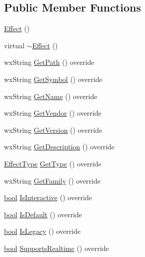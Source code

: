 \subsection*{Public Member Functions}
\begin{DoxyCompactItemize}
\item 
\hyperlink{class_effect_a4dae74244f59936a49847da9217b4126}{Effect} ()
\item 
virtual \hyperlink{class_effect_ac26c0a394247e14c9081f875522b5b66}{$\sim$\+Effect} ()
\item 
wx\+String \hyperlink{class_effect_a943281414ea9d5a4a94d7c0f77914c81}{Get\+Path} () override
\item 
wx\+String \hyperlink{class_effect_a9d3efabee9b08c83cf21888181aa3ac4}{Get\+Symbol} () override
\item 
wx\+String \hyperlink{class_effect_abf4cb8b7c9b5179651dc5a5159fd168e}{Get\+Name} () override
\item 
wx\+String \hyperlink{class_effect_ab1985c15794aa282b7bec7f794c68b5a}{Get\+Vendor} () override
\item 
wx\+String \hyperlink{class_effect_aa7da4a49885d4ee039a5e4a00dfde6ca}{Get\+Version} () override
\item 
wx\+String \hyperlink{class_effect_abd891587dbb0c76b4e6755aff5f8af9e}{Get\+Description} () override
\item 
\hyperlink{_effect_interface_8h_a4809a7bb3fd1a421902a667cc1405d43}{Effect\+Type} \hyperlink{class_effect_ae21a3ad02f4527cd1ba46bcc93972f32}{Get\+Type} () override
\item 
wx\+String \hyperlink{class_effect_ac80e1e3686fcaec4c73adca19c754dd0}{Get\+Family} () override
\item 
\hyperlink{mac_2config_2i386_2lib-src_2libsoxr_2soxr-config_8h_abb452686968e48b67397da5f97445f5b}{bool} \hyperlink{class_effect_ab2eadc18442f6e44d211c14f5abfc7b2}{Is\+Interactive} () override
\item 
\hyperlink{mac_2config_2i386_2lib-src_2libsoxr_2soxr-config_8h_abb452686968e48b67397da5f97445f5b}{bool} \hyperlink{class_effect_a4cc18df9ec214ebcc9dd246c55575743}{Is\+Default} () override
\item 
\hyperlink{mac_2config_2i386_2lib-src_2libsoxr_2soxr-config_8h_abb452686968e48b67397da5f97445f5b}{bool} \hyperlink{class_effect_abd75e7d5c3476c542bf06748dadb39bf}{Is\+Legacy} () override
\item 
\hyperlink{mac_2config_2i386_2lib-src_2libsoxr_2soxr-config_8h_abb452686968e48b67397da5f97445f5b}{bool} \hyperlink{class_effect_ab23b370c5581370daa2bcda0979dea07}{Supports\+Realtime} () override

\end{DoxyCompactItemize}
